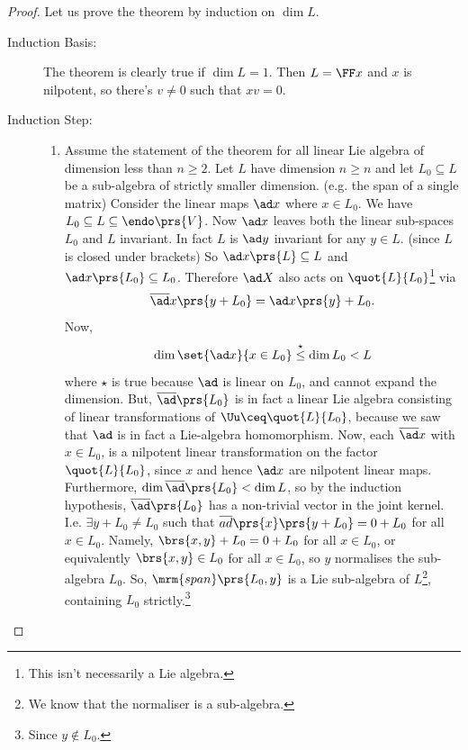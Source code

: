 \documentclass[10pt,a4paper,twoside,openany,hidelinks]{book}
\begin{document}
\begin{proof}
Let us prove the theorem by induction on $\dim L$.
\begin{description}
\item[Induction Basis:]
The theorem is clearly true if $\dim L = 1$. Then $L = \FF x$ and $x$ is nilpotent, so there's $v \neq 0$ such that $xv = 0$.
\item[Induction Step:]
\begin{enumerate}[label=(\Roman*)]
\item
Assume the statement of the theorem for all linear Lie algebra of dimension less than $n\geq 2$.
Let $L$ have dimension $n \geq n$ and let $L_0 \subseteq L$ be a sub-algebra of strictly smaller dimension. (e.g. the span of a single matrix)
Consider the linear maps $\ad x$ where $x \in L_0$.
We have $L_0 \subseteq L \subseteq \endo\prs{V}$. Now $\ad x$ leaves both the linear sub-spaces $L_0$ and $L$ invariant. In fact $L$ is $\ad y$ invariant for any $y \in L$. (since $L$ is closed under brackets)
So $\ad x \prs{L} \subseteq L$ and $\ad x \prs{L_0} \subseteq L_0$. Therefore $\ad X$ also acts on $\quot{L}{L_0}$\footnote{This isn't necessarily a Lie algebra.} via
\[\overline{\ad} x \prs{y + L_0} = \ad x \prs{y} + L_0 \text{.}\]
Now, \[\dim \set{\ad x}{x \in L_0} \stackrel{\star}{\leq} \dim L_0 < L\]
where $\star$ is true because $\ad$ is linear on $L_0$, and cannot expand the dimension.
But, $\overline{\ad}\prs{L_0}$ is in fact a linear Lie algebra consisting of linear transformations of $\Uu \ceq \quot{L}{L_0}$,  because we saw that $\ad$ is in fact a Lie-algebra homomorphism.
Now, each $\overline{\ad}x$ with $x \in L_0$, is a nilpotent linear transformation on the factor $\quot{L}{L_0}$, since $x$ and hence $\ad x$ are nilpotent linear maps.
Furthermore, $\dim \overline{\ad}\prs{L_0} < \dim L$, so by the induction hypothesis, $\overline{\ad}\prs{L_0}$ has a non-trivial vector in the joint kernel. I.e. $\exists y + L_0 \neq L_0$ such that $\overline{ad}\prs{x}\prs{y + L_0} = 0 + L_0$ for all $x \in L_0$. Namely, $\brs{x,y}+L_0 = 0 + L_0$ for all $x \in L_0$, or equivalently $\brs{x,y} \in L_0$ for all $x \in L_0$, so $y$ normalises the sub-algebra $L_0$. So, $\mrm{span}\prs{L_0, y}$ is a Lie sub-algebra of $L$\footnote{We know that the normaliser is a sub-algebra.}, containing $L_0$ strictly.\footnote{Since $y \notin L_0$.}


\end{enumerate}
\end{description}
\end{proof}
\end{document}
